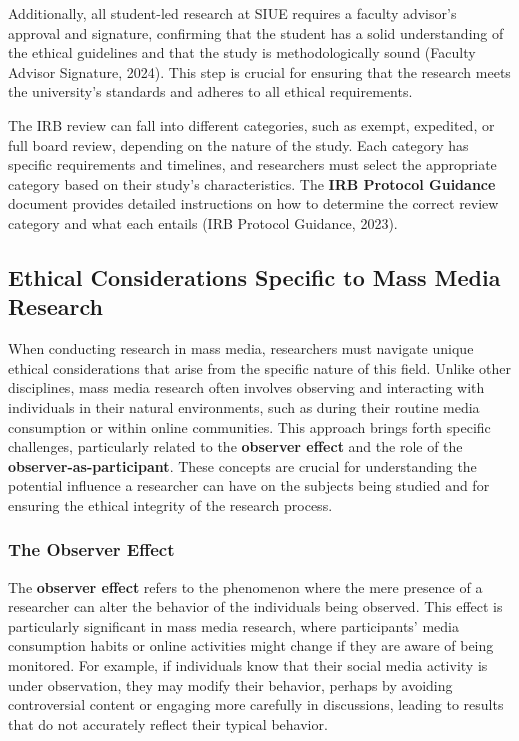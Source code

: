 \documentclass[
]{book}
\begin{document}
Additionally, all student-led research at SIUE requires a faculty advisor's approval and signature, confirming that the student has a solid understanding of the ethical guidelines and that the study is methodologically sound (Faculty Advisor Signature, 2024). This step is crucial for ensuring that the research meets the university's standards and adheres to all ethical requirements.

The IRB review can fall into different categories, such as exempt, expedited, or full board review, depending on the nature of the study. Each category has specific requirements and timelines, and researchers must select the appropriate category based on their study's characteristics. The \textbf{IRB Protocol Guidance} document provides detailed instructions on how to determine the correct review category and what each entails (IRB Protocol Guidance, 2023).

\subsection*{Ethical Considerations Specific to Mass Media Research}\label{ethical-considerations-specific-to-mass-media-research}

When conducting research in mass media, researchers must navigate unique ethical considerations that arise from the specific nature of this field. Unlike other disciplines, mass media research often involves observing and interacting with individuals in their natural environments, such as during their routine media consumption or within online communities. This approach brings forth specific challenges, particularly related to the \textbf{observer effect} and the role of the \textbf{observer-as-participant}. These concepts are crucial for understanding the potential influence a researcher can have on the subjects being studied and for ensuring the ethical integrity of the research process.

\subsubsection*{The Observer Effect}\label{the-observer-effect}

The \textbf{observer effect} refers to the phenomenon where the mere presence of a researcher can alter the behavior of the individuals being observed. This effect is particularly significant in mass media research, where participants' media consumption habits or online activities might change if they are aware of being monitored. For example, if individuals know that their social media activity is under observation, they may modify their behavior, perhaps by avoiding controversial content or engaging more carefully in discussions, leading to results that do not accurately reflect their typical behavior.
\end{document}
